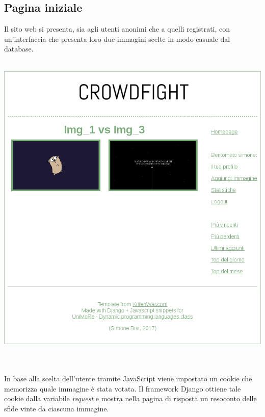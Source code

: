 \documentclass{scrreprt}
\begin{document}
\subsection{Pagina iniziale}
Il sito web si presenta, sia agli utenti anonimi che a quelli registrati, con un'interfaccia che presenta loro due immagini scelte in modo casuale dal database.
\\\\
\centerline{\includegraphics[scale=0.40]{front}}
\\\\
In base alla scelta dell'utente tramite JavaScript viene impostato un cookie che memorizza quale immagine è stata votata. Il framework Django ottiene tale cookie dalla variabile \textit{request} e mostra nella pagina di risposta un resoconto delle sfide vinte da ciascuna immagine.\\
\end{document}
